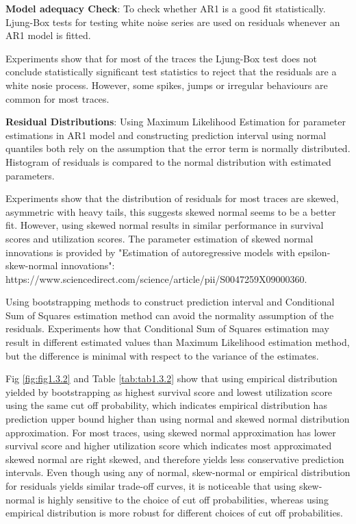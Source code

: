 \documentclass{article}
\begin{document}
\begin{flushleft}
\textbf{Model adequacy Check}: To check whether AR1 is a good fit statistically. Ljung-Box tests for testing white noise series are used on residuals whenever an AR1 model is fitted.

Experiments show that for most of the traces the Ljung-Box test does not conclude statistically significant test statistics to reject that the residuals are a white nosie process. However, some spikes, jumps or irregular behaviours are common for most traces. 
\end{flushleft}

\begin{flushleft}
\textbf{Residual Distributions}: Using Maximum Likelihood Estimation for parameter estimations in AR1 model and constructing prediction interval using normal quantiles both rely on the assumption that the error term is normally distributed. Histogram of residuals is compared to the normal distribution with estimated parameters.

Experiments show that the distribution of residuals for most traces are skewed, asymmetric with heavy tails, this suggests skewed normal seems to be a better fit. However, using skewed normal results in similar performance in survival scores and utilization scores. The parameter estimation of skewed normal innovations is provided by "Estimation of autoregressive models with epsilon-skew-normal innovations": https://www.sciencedirect.com/science/article/pii/S0047259X09000360.

Using bootstrapping methods to construct prediction interval and Conditional Sum of Squares estimation method can avoid the normality assumption of the residuals. Experiments how that Conditional Sum of Squares estimation may result in different estimated values than Maximum Likelihood estimation method, but the difference is minimal with respect to the variance of the estimates. 

Fig \ref{fig:fig1.3.2} and Table \ref{tab:tab1.3.2} show that using empirical distribution yielded by bootstrapping as highest survival score and lowest utilization score using the same cut off probability, which indicates empirical distribution has prediction upper bound higher than using normal and skewed normal distribution approximation. For most traces, using skewed normal approximation has lower survival score and higher utilization score which indicates most approximated skewed normal are right skewed, and therefore yields less conservative prediction intervals. Even though using any of normal, skew-normal or empirical distribution for residuals yields similar trade-off curves, it is noticeable that using skew-normal is highly sensitive to the choice of cut off probabilities, whereas using empirical distribution is more robust for different choices of cut off probabilities.
\end{flushleft}
\end{document}
